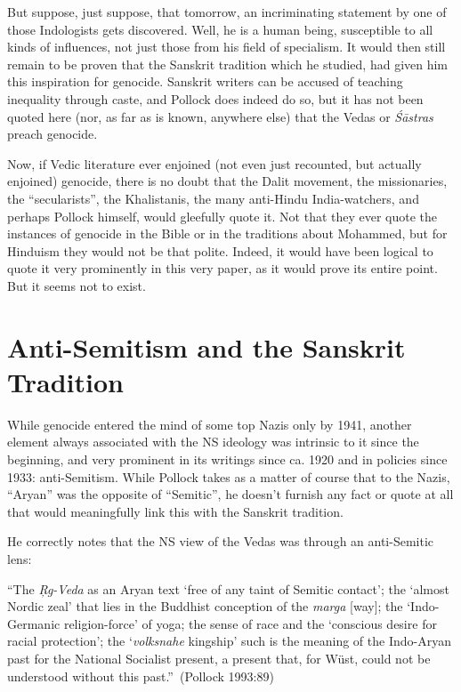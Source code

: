 But suppose, just suppose, that tomorrow, an incriminating statement by one of those Indologists gets discovered. Well, he is a human being, susceptible to all kinds of influences, not just those from his field of specialism. It would then still remain to be proven that the Sanskrit tradition which he studied, had given him this inspiration for genocide. Sanskrit writers can be accused of teaching inequality through caste, and Pollock does indeed do so, but it has not been quoted here (nor, as far as is known, anywhere else) that the Vedas or {\sl Śāstras} preach genocide.

Now, if Vedic literature ever enjoined (not even just recounted, but actually enjoined) genocide, there is no doubt that the Dalit movement, the missionaries, the “secularists”, the Khalistanis, the many anti-Hindu India-watchers, and perhaps Pollock himself, would gleefully quote it. Not that they ever quote the instances of genocide in the Bible or in the traditions about Mohammed, but for Hinduism they would not be that polite. Indeed, it would have been logical to quote it very prominently in this very paper, as it would prove its entire point. But it seems not to exist.

\section*{Anti-Semitism and the Sanskrit Tradition}

While genocide entered the mind of some top Nazis only by 1941, another element always associated with the NS ideology was intrinsic to it since the beginning, and very prominent in its writings since ca. 1920 and in policies since 1933: anti-Semitism. While Pollock takes as a matter of course that to the Nazis, “Aryan” was the opposite of “Semitic”, he doesn’t furnish any fact or quote at all that would meaningfully link this with the Sanskrit tradition.

He correctly notes that the NS view of the Vedas was through an anti-Semitic lens: 
\begin{myquote}
“The {\sl Ŗg-Veda} as an Aryan text ‘free of any taint of Semitic contact’; the ‘almost Nordic zeal’ that lies in the Buddhist conception of the {\sl marga} [way]; the ‘Indo-Germanic religion-force’ of yoga; the sense of race and the ‘conscious desire for racial protection’; the ‘{\sl volksnahe} kingship’ such is the meaning of the Indo-Aryan past for the National Socialist present, a present that, for Wüst, could not be understood without this past.”~\hfill(Pollock 1993:89)
\end{myquote}

